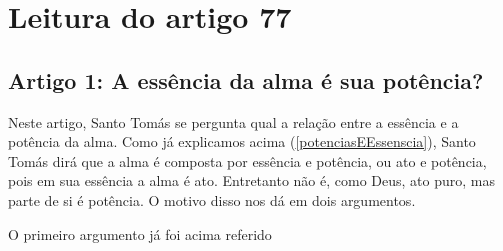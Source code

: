 \documentclass[
	article,			%
	12pt,				%
	oneside,			%
	a4paper,			%
	english,			%
	brazil,				%
	sumario=tradicional,
	doublespacing
	]{abntex2}
\begin{document}

\section{Leitura do artigo 77}

\subsection{Artigo 1: A essência da alma é sua potência?}
\label{leitura:a1}

Neste artigo, Santo Tomás se pergunta qual a relação entre a essência e a potência da alma. Como já explicamos acima (\ref{potenciasEEssenscia}), Santo Tomás dirá que a alma é composta por essência e potência, ou ato e potência, pois em sua essência a alma é ato. Entretanto não é, como Deus, ato puro, mas parte de si é potência. O motivo disso nos dá em dois argumentos.

O primeiro argumento já foi acima referido



% 

\postextual


\end{document}
